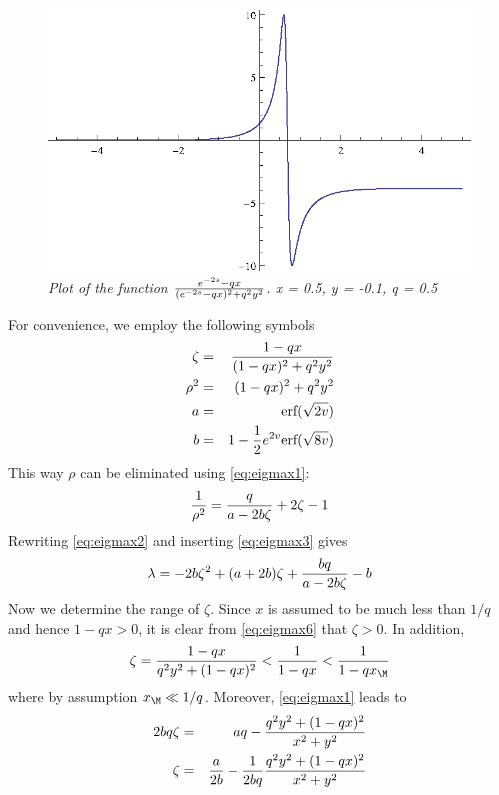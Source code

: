 \begin{figure}[htb!]
  \centering
  \includegraphics[scale=0.6]{../pics/BlueRealDen.eps}
  \caption{\small \it Plot of the function
    $e^{-2s}-qx \over (e^{-2s}-qx)^2 + q^2y^2
    $. x = 0.5, y = -0.1, q = 0.5
  }
  \label{fig:BlueRealDenPos}
\end{figure}
For convenience, we employ the following symbols
\begin{eqnarray}
  \zeta &=& {1 - qx \over (1-qx)^2 + q^2y^2} \label{eq:eigmax6}\\
  \rho^2 &=& (1-qx)^2 + q^2y^2  \label{eq:eigmax7}\\
  a &=& \text{erf}(\sqrt{2v})  \label{eq:eigmax8} \\
  b &=& 1-{1 \over 2}e^{2v}\text{erf}(\sqrt{8v})  \label{eq:eigmax9}
\end{eqnarray}
This way $\rho$ can be eliminated using \eqref{eq:eigmax1}:
\begin{equation}\label{eq:eigmax3}
  {1 \over \rho^2} = {q \over a - 2b\zeta} +2\zeta -1
\end{equation}
Rewriting \eqref{eq:eigmax2} and inserting \eqref{eq:eigmax3} gives
\begin{equation}\label{eq:eigmax4}
  \lambda = -2b\zeta^2 + (a+2b)\zeta + {bq \over a-2b\zeta} - b
\end{equation}
Now we determine the range of $\zeta$. Since $x$ is assumed to be much
less than $1/q$ and hence $1 - qx > 0$, it is clear from
\eqref{eq:eigmax6} that $\zeta > 0$. In addition,
\begin{equation*}
  \zeta = \frac{1-q x}{q^2 y^2+(1-q x)^2} < \frac{1}{1-qx} < \frac{1}{1-qx_\M}
\end{equation*}
where by assumption $x_\M \ll 1/q$. Moreover, \eqref{eq:eigmax1} leads to
\begin{eqnarray*}
  2bq\zeta &=& aq - \frac{q^2 y^2+(1-q x)^2}{x^2+y^2} \\
  \zeta &=& {a \over 2b} - {1 \over 2bq}\frac{q^2 y^2+(1-q x)^2}{x^2+y^2}
\end{eqnarray*}
